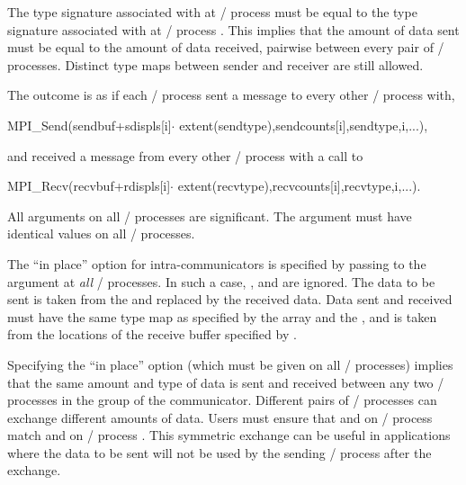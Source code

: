 The type signature associated with
 at \MPI/ process  must be equal
to the type signature
associated with  at \MPI/ process .
This implies that the amount of data sent must be equal to the
amount of data received, pairwise between every pair of \MPI/ processes.
Distinct type maps between sender and receiver are still allowed.

The outcome is as if each \MPI/ process sent a message to every other \MPI/ process
with,
\begin{mpicodeblock}
MPI\_Send(sendbuf+sdispls[i]$\cdot$ extent(sendtype),sendcounts[i],sendtype,i,...),
\end{mpicodeblock}
\noindent and received a message from every other \MPI/ process with
a call to
\begin{mpicodeblock}
MPI\_Recv(recvbuf+rdispls[i]$\cdot$ extent(recvtype),recvcounts[i],recvtype,i,...).
\end{mpicodeblock}

All arguments
on all \MPI/ processes are significant.  The argument 
must have identical values on all \MPI/ processes.

The ``in place'' option for intra-communicators is specified by passing
 to the argument  at \emph{all} \MPI/ processes.
In such a case, ,  and  are ignored.
The data to be sent is taken from the  and replaced by the received data.
Data sent and received must have the same type map as specified by the 
array and the , and is taken from the locations of the receive buffer
specified by .

\begin{users}
Specifying the ``in place'' option (which must be given on all \MPI/ processes)
implies that the same amount and type of data is sent and received between
any two \MPI/ processes in the group of the communicator.
Different pairs of \MPI/ processes can exchange different amounts of data.
Users must ensure that  and  on \MPI/ process
 match  and  on \MPI/ process .
This symmetric exchange can be useful in applications where the data to be sent will
not be used by the sending \MPI/ process after the  exchange.
\end{users}

